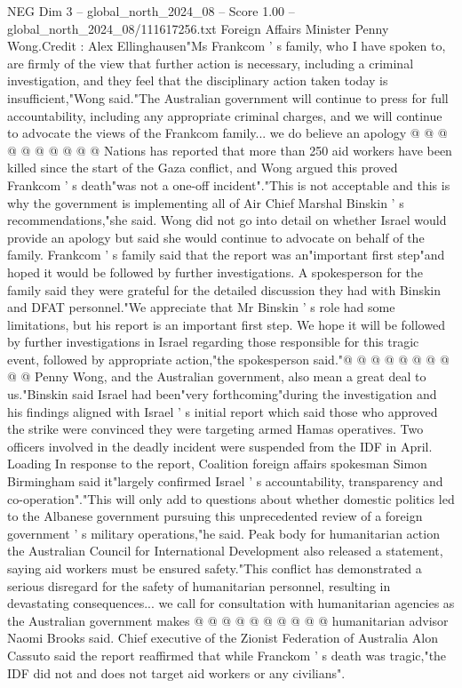 \begin{textsample}{NEG Dim 3 – global\_north\_2024\_08 – Score 1.00 – global\_north\_2024\_08/111617256.txt}
Foreign Affairs Minister Penny Wong.Credit : Alex Ellinghausen"Ms Frankcom ' s family, who I have spoken to, are firmly of the view that further action is necessary, including a criminal investigation, and they feel that the disciplinary action taken today is insufficient,"Wong said."The Australian government will continue to press for full accountability, including any appropriate criminal charges, and we will continue to advocate the views of the Frankcom family... we do believe an apology @ @ @ @ @ @ @ @ @ @ Nations has reported that more than 250 aid workers have been killed since the start of the Gaza conflict, and Wong argued this proved Frankcom ' s death"was not a one-off incident"."This is not acceptable and this is why the government is implementing all of Air Chief Marshal Binskin ' s recommendations,"she said.
Wong did not go into detail on whether Israel would provide an apology but said she would continue to advocate on behalf of the family.
Frankcom ' s family said that the report was an"important first step"and hoped it would be followed by further investigations.
A spokesperson for the family said they were grateful for the detailed discussion they had with Binskin and DFAT personnel."We appreciate that Mr Binskin ' s role had some limitations, but his report is an important first step.
We hope it will be followed by further investigations in Israel regarding those responsible for this tragic event, followed by appropriate action,"the spokesperson said."@ @ @ @ @ @ @ @ @ @ Penny Wong, and the Australian government, also mean a great deal to us."Binskin said Israel had been"very forthcoming"during the investigation and his findings aligned with Israel ' s initial report which said those who approved the strike were convinced they were targeting armed Hamas operatives.
Two officers involved in the deadly incident were suspended from the IDF in April.
Loading In response to the report, Coalition foreign affairs spokesman Simon Birmingham said it"largely confirmed Israel ' s accountability, transparency and co-operation"."This will only add to questions about whether domestic politics led to the Albanese government pursuing this unprecedented review of a foreign government ' s military operations,"he said.
Peak body for humanitarian action the Australian Council for International Development also released a statement, saying aid workers must be ensured safety."This conflict has demonstrated a serious disregard for the safety of humanitarian personnel, resulting in devastating consequences... we call for consultation with humanitarian agencies as the Australian government makes @ @ @ @ @ @ @ @ @ @ humanitarian advisor Naomi Brooks said.
Chief executive of the Zionist Federation of Australia Alon Cassuto said the report reaffirmed that while Franckom ' s death was tragic,"the IDF did not and does not target aid workers or any civilians".

\end{textsample}
